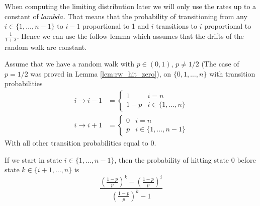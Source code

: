 \begin{remark}
When computing the limiting distribution later we will only use the rates up to a constant of $lambda$.
That means that the probability of transitioning from any $i \in \{1,\ldots,n - 1\}$ to $i - 1$ proportional to 1 and $i$ transitions to $i$ proportional to $\frac{1}{1 + \lambda}$.
Hence we can use the follow lemma which assumes that the drifts of the random walk are constant.
\end{remark}

\begin{lemma}\label{lem:rw_p_hit_zero}
Assume that we have a random walk with $p \in (0, 1)$, $p \not = 1/2$ (The case of $p = 1/2$ was proved in Lemma \ref{lem:rw_hit_zero}), on $\{0,1,\ldots, n\}$ with transition probabilities
\begin{align*}
    i \to i - 1 &= \begin{cases}
        1 & i = n\\
        1 - p & i \in \{1,\ldots, n\}
    \end{cases}\\
    i \to i + 1 &= \begin{cases}
        0 & i = n\\
        p & i \in \{1,\ldots, n-1\}
    \end{cases}
\end{align*}
With all other transition probabilities equal to 0.

If we start in state $i \in \{1,\ldots, n - 1\}$, then the probability of hitting state 0 before state $k \in \{i + 1, \ldots, n\}$ is
$$
\frac{
        \left( \frac{1 - p}{p} \right)^{k} - \left( \frac{1 - p}{p} \right)^{i}
    }{
         \left( \frac{1 - p}{p} \right)^{k} - 1
    }
$$
\end{lemma}

